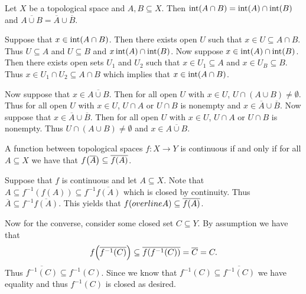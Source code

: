 \documentclass[letterpaper, 11pt, oneside]{book}
\begin{document}
\begin{prop}
  Let $X$ be a topological space and $A, B \subseteq X$.
  Then $\operatorname{int}(A \cap B) = \operatorname{int}(A) \cap \operatorname{int}(B)$ and $\overline{A \cup B} = \overline{A} \cup \overline{B}$.
\end{prop}
\begin{pf}
  Suppose that $x \in \operatorname{int}(A \cap B)$.
  Then there exists open $U$ such that $x \in U \subseteq A \cap B$.
  Thus $U \subseteq A$ and $U \subseteq B$ and $x \operatorname{int}(A) \cap \operatorname{int}(B)$.
  Now suppose $x \in \operatorname{int}(A) \cap \operatorname{int}(B)$. Then there exists open sets $U_{1}$ and $U_{2}$ such that $x \in U_{1} \subseteq A$ and $x \in U_{B} \subseteq B$.
  Thus $x \in U_{1} \cap U_{2} \subseteq A \cap B$ which implies that $x \in \operatorname{int}(A \cap B)$.

  Now suppose that $x \in \overline{A \cup B}$.
  Then for all open $U$ with $x \in U$, $U \cap (A \cup B) \neq \emptyset$.
  Thus for all open $U$ with $x \in U$, $U \cap A$ or $U \cap B$ is nonempty and $x \in \overline{A} \cup \overline{B}$.
  Now suppose that $x \in \overline{A} \cup \overline{B}$.
  Then for all open $U$ with $x \in U$, $U \cap A$ or $U \cap B$  is nonempty.
  Thus $U \cap (A \cup B) \neq \emptyset$ and $x \in \overline{A \cup B}$.
\end{pf}

\begin{prop}\label{prop: continuous_iff_im_closure_subset_closure_im}
  A function between topological spaces $f\colon X \to Y$ is continuous if and only if for all $A \subseteq X$ we have that $f\pqty{\overline{A}} \subseteq \overline{f(A)}$.
\end{prop}
\begin{pf}
  Suppose that $f$ is continuous and let $A \subseteq X$.
  Note that $A \subseteq f^{-1}(f(A)) \subseteq f^{-1}\overline{f(A)}$ which is closed by continuity.
  Thus $\overline{A} \subseteq f^{-1}\overline{f(A)}$.
  This yields that $f\pqty{overline{A}} \subseteq \overline{f(A)}$.

  Now for the converse, consider some closed set $C \subseteq Y$.
  By assumption we have that
  \[
    f\pqty{\overline{f^{-1}(C)}} \subseteq \overline{f\pqty{f^{-1}(C)}} = \overline{C} = C.
  \]
  Thus $\overline{f^{-1}(C)} \subseteq f^{-1}(C)$.
  Since we know that $f^{-1}(C) \subseteq \overline{f^{-1}(C)}$ we have equality and thus $f^{-1}(C)$ is closed as desired.
\end{pf}
\end{document}
